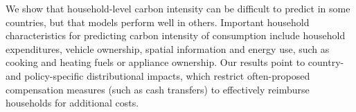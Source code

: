 \documentclass[12pt, a4paper]{article}
\begin{document}



We show that household-level carbon intensity  can be difficult to predict in some countries, but that models perform well in others. Important household characteristics for predicting carbon intensity of consumption include household expenditures, vehicle ownership, spatial information and energy use, such as cooking and heating fuels or appliance ownership. Our results point to country- and policy-specific distributional impacts, which restrict often-proposed compensation measures (such as cash transfers) to effectively reimburse households for additional costs.
\end{document}

